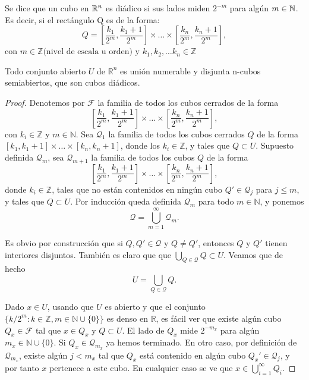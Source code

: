 \begin{definición}
Se dice que un cubo en $\mathbb{R}^n$ es diádico si sus lados miden $2^{-m}$ para algún $m \in \mathbb{N}$.
Es decir, si el rectángulo Q es de la forma:
\[Q = \left[\frac{k_1}{2^m}, \frac{k_1 + 1}{2^m}\right] \times \dots \times \left[\frac{k_n}{2^m}, \frac{k_n + 1}{2^m}\right],\]
con $m \in \mathbb{Z} \text{(nivel de escala u orden) y } k_1, k_2, \dots k_n
    \in \mathbb{Z}$
\end{definición}

\begin{teorema}
    Todo conjunto abierto $U$ de $\mathbb{R}^n$ es unión numerable y disjunta n-cubos semiabiertos, que son cubos diádicos.
\end{teorema}

\begin{proof}
    Denotemos por $\mathcal{F}$ la familia de todos los cubos cerrados de la forma
    \[
        \left[\frac{k_1}{2^m}, \frac{k_1 + 1}{2^m}\right] \times \dots \times \left[\frac{k_n}{2^m}, \frac{k_n + 1}{2^m}\right],
    \]
    con $k_i \in \mathbb{Z}$ y $m \in \mathbb{N}$. Sea $\mathcal{Q}_1$ la familia
    de todos los cubos cerrados $Q$ de la forma $[k_1, k_1 + 1] \times \dots \times
        [k_n, k_n + 1]$, donde los $k_i \in \mathbb{Z}$, y tales que $Q \subset U$.
    Supuesto definida $\mathcal{Q}_m$, sea $\mathcal{Q}_{m+1}$ la familia de todos
    los cubos $Q$ de la forma
    \[
        \left[\frac{k_1}{2^m}, \frac{k_1+1}{2^m}\right] \times \dots \times \left[\frac{k_n}{2^m}, \frac{k_n+1}{2^m}\right],
    \]
    donde $k_i \in \mathbb{Z}$, tales que no están contenidos en ningún cubo $Q'
        \in \mathcal{Q}_j$ para $j \leq m$, y tales que $Q \subset U$. Por inducción
    queda definida $\mathcal{Q}_m$ para todo $m \in \mathbb{N}$, y ponemos
    \[
        \mathcal{Q} = \bigcup_{m=1}^{\infty} \mathcal{Q}_m.
    \]

    Es obvio por construcción que si $Q, Q' \in \mathcal{Q}$ y $Q \neq Q'$,
    entonces $Q$ y $Q'$ tienen interiores disjuntos. También es claro que que
    $\bigcup_{Q \in \mathcal{Q}} Q \subset U$. Veamos que de hecho
    \[
        U = \bigcup_{Q \in \mathcal{Q}} Q.
    \]

    Dado $x \in U$, usando que $U$ es abierto y que el conjunto $\{k/2^m : k \in
        \mathbb{Z}, m \in \mathbb{N} \cup \{0\}\}$ es denso en $\mathbb{R}$, es fácil
    ver que existe algún cubo $Q_x \in \mathcal{F}$ tal que $x \in Q_x$ y $Q
        \subset U$. El lado de $Q_x$ mide $2^{-m_x}$ para algún $m_x \in \mathbb{N}
        \cup \{0\}$. Si $Q_x \in \mathcal{Q}_{m_x}$ ya hemos terminado. En otro caso,
    por definición de $\mathcal{Q}_{m_x}$, existe algún $j < m_x$ tal que $Q_x$
    está contenido en algún cubo $Q_x' \in \mathcal{Q}_j$, y por tanto $x$
    pertenece a este cubo. En cualquier caso se ve que $x \in
        \bigcup_{i=1}^{\infty} Q_i$.
\end{proof}

